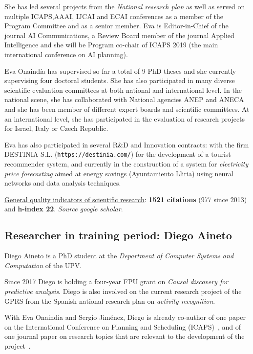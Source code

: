 \documentclass[10pt,a4paper]{paper}
\begin{document}
She has led several projects from the {\em National research plan} as well as served on multiple ICAPS,AAAI, IJCAI and ECAI conferences as a member of the Program Committee and as a senior member. Eva is Editor-in-Chief of the journal AI Communications, a Review Board member of the journal Applied Intelligence and she will be Program co-chair of ICAPS 2019 (the main international conference on AI planning). 

Eva Onaindía has supervised so far a total of 9 PhD theses and she currently supervising four doctoral students. She has also participated in many diverse scientific evaluation committees at both national and international level. In the national scene, she has collaborated with National agencies ANEP and ANECA and she has been member of different expert boards and scientific committees. At an international level, she has participated in the evaluation of research projects for Israel, Italy or Czech Republic.

Eva has also participated in several R\&D and Innovation contracts: with the firm {\sc DESTINIA S.L.} ({\tt https://destinia.com/}) for the development of a tourist recommender system, and currently in the construction of a system for {\em electricity price forecasting} aimed at energy savings (Ayuntamiento Lliria) using neural networks and data analysis techniques.

\underline{General quality indicators of scientific research}: {\bf 1521 citations} (977 since 2013) and {\bf h-index 22}. {\scriptsize\em Source google scholar}.


\subsection{Researcher in training period: Diego Aineto}
Diego Aineto is a PhD student at the {\em Department of Computer Systems and Computation} of the UPV.

Since 2017 Diego is holding a four-year FPU grant on {\em Causal discovery for predictive analysis}. Diego is also involved on the current research project of the GPRS from the Spanish national research plan on {\em activity recognition}.

With Eva Onaindia and Sergio Jiménez, Diego is already co-author of one paper on the International Conference on Planning and Scheduling (ICAPS)~\cite{diego-icaps18}, and of one journal paper on research topics that are relevant to the development of the project~\cite{onaindia2018common}. 


\newpage
\end{document}
